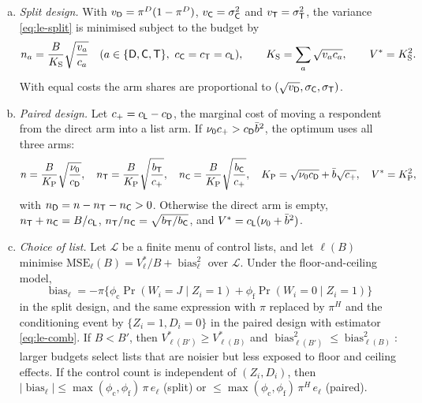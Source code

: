 \begin{theorem}\label{thm:design}
\begin{enumerate}[(a)]
  \item \emph{Split design.} With $v_{\mathsf{D}}=\pi^D(1-\pi^D)$, $v_{\mathsf{C}}=\sigma_{\mathsf{C}}^2$ and $v_{\mathsf{T}}=\sigma_{\mathsf{T}}^2$, the variance \eqref{eq:le-split} is minimised subject to the budget by
  \begin{equation}\label{eq:le-neyman}
    n_a=\frac{B}{K_{\mathrm S}}\sqrt{\frac{v_a}{c_a}}\quad(a\in\{\armD,\armC,\armT\},\ c_{\armC}=c_{\armT}=c_{\armL}),\qquad K_{\mathrm S}=\sum_a\sqrt{v_ac_a},\qquad V^*=K_{\mathrm S}^2 .
  \end{equation}
  With equal costs the arm shares are proportional to $(\sqrt{v_{\mathsf{D}}},\sigma_{\mathsf{C}},\sigma_{\mathsf{T}})$.
  \item \emph{Paired design.} Let $c_+=c_{\mathsf{L}}-c_{\mathsf{D}}$, the marginal cost of moving a respondent from the direct arm into a list arm. If $\nu_0c_+>c_{\mathsf{D}}\bar b^2$, the optimum uses all three arms:
  \begin{equation}\label{eq:le-paired-int}
    n=\frac{B}{K_{\mathrm P}}\sqrt{\frac{\nu_0}{c_{\mathsf{D}}}},\quad
    n_{\mathsf{T}}=\frac{B}{K_{\mathrm P}}\sqrt{\frac{b_{\mathsf{T}}}{c_+}},\quad
    n_{\mathsf{C}}=\frac{B}{K_{\mathrm P}}\sqrt{\frac{b_{\mathsf{C}}}{c_+}},\quad
    K_{\mathrm P}=\sqrt{\nu_0c_{\mathsf{D}}}+\bar b\sqrt{c_+},\quad V^*=K_{\mathrm P}^2,
  \end{equation}
  with $n_{\mathsf{D}}=n-n_{\mathsf{T}}-n_{\mathsf{C}}>0$. Otherwise the direct arm is empty, $n_{\mathsf{T}}+n_{\mathsf{C}}=B/c_{\mathsf{L}}$, $n_{\mathsf{T}}/n_{\mathsf{C}}=\sqrt{b_{\mathsf{T}}/b_{\mathsf{C}}}$, and $V^*=c_{\mathsf{L}}(\nu_0+\bar b^2)$.
  \item \emph{Choice of list.} Let $\mathcal L$ be a finite menu of control lists, and let $\ell(B)$ minimise $\mathrm{MSE}_\ell(B)=V^*_\ell/B+\operatorname{bias}_\ell^2$ over $\mathcal L$. Under the floor-and-ceiling model,
  \begin{equation}\label{eq:le-fcbias}
    \operatorname{bias}_\ell=-\pi\bigl\{\phi_{\mathrm c}\Pr(W_i=J\mid Z_i=1)+\phi_{\mathrm f}\Pr(W_i=0\mid Z_i=1)\bigr\}
  \end{equation}
  in the split design, and the same expression with $\pi$ replaced by $\pi^H$ and the conditioning event by $\{Z_i=1,D_i=0\}$ in the paired design with estimator \eqref{eq:le-comb}. If $B<B'$, then $V^*_{\ell(B')}\ge V^*_{\ell(B)}$ and $\operatorname{bias}_{\ell(B')}^2\le\operatorname{bias}_{\ell(B)}^2$: larger budgets select lists that are noisier but less exposed to floor and ceiling effects. If the control count is independent of $(Z_i,D_i)$, then $|\operatorname{bias}_\ell|\le\max(\phi_{\mathrm c},\phi_{\mathrm f})\,\pi\,e_\ell$ (split) or $\le\max(\phi_{\mathrm c},\phi_{\mathrm f})\,\pi^H\,e_\ell$ (paired).

\end{enumerate}
\end{theorem}
